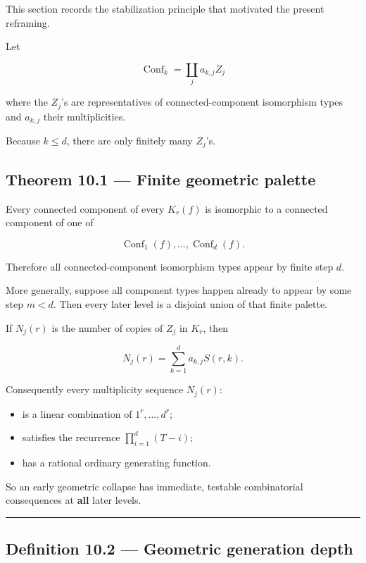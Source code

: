 This section records the stabilization principle that motivated the
present reframing.

Let

\[
\operatorname{Conf}_k=\coprod_j a_{k,j}Z_j
\]

where the \(Z_j\)'s are representatives of connected-component
isomorphism types and \(a_{k,j}\) their multiplicities.

Because \(k\le d\), there are only finitely many \(Z_j\)'s.

\subsection{Theorem 10.1 --- Finite geometric
palette}\label{theorem-10.1-finite-geometric-palette}

Every connected component of every \(K_r(f)\) is isomorphic to a
connected component of one of

\[
\operatorname{Conf}_1(f),\dots,\operatorname{Conf}_d(f).
\]

Therefore all connected-component isomorphism types appear by finite
step \(d\).

More generally, suppose all component types happen already to appear by
some step \(m<d\). Then every later level is a disjoint union of that
finite palette.

If \(N_j(r)\) is the number of copies of \(Z_j\) in \(K_r\), then

\[
\boxed{
N_j(r)=\sum_{k=1}^d a_{k,j}S(r,k).
}
\]

Consequently every multiplicity sequence \(N_j(r)\):

\begin{itemize}
\tightlist
\item
  is a linear combination of \(1^r,\dots,d^r\);
\item
  satisfies the recurrence \(\prod_{i=1}^d(T-i)\);
\item
  has a rational ordinary generating function.
\end{itemize}

So an early geometric collapse has immediate, testable combinatorial
consequences at \textbf{all} later levels.

\begin{center}\rule{0.5\linewidth}{0.5pt}\end{center}

\subsection{Definition 10.2 --- Geometric generation
depth}\label{definition-10.2-geometric-generation-depth}

